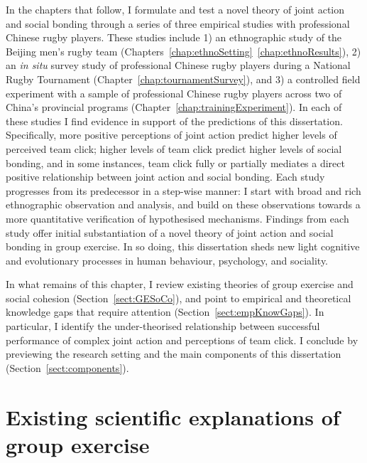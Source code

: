 \begin{CJK}{UTF8}{gbsn}
In the chapters that follow, I formulate and test a novel theory of joint action and social bonding through a series of three empirical studies with professional Chinese rugby players.  These studies include 1) an ethnographic study of the Beijing men's rugby team (Chapters~\ref{chap:ethnoSetting}\nobreakdash~\ref{chap:ethnoResults}), 2) an \textit{in situ} survey study of professional Chinese rugby players during a National Rugby Tournament (Chapter~\ref{chap:tournamentSurvey}), and 3) a controlled field experiment with a sample of professional Chinese rugby players across two of China's provincial programs (Chapter~\ref{chap:trainingExperiment}).  In each of these studies I find evidence in support of the predictions of this dissertation.  Specifically, more positive perceptions of joint action predict higher levels of perceived team click; higher levels of team click predict higher levels of social bonding, and in some instances, team click fully or partially mediates a direct positive relationship between  joint action and social bonding.  Each study progresses from its predecessor in a step-wise manner: I start with broad and rich ethnographic observation and analysis, and build on these observations towards a more quantitative verification of hypothesised mechanisms.  Findings from each study offer initial substantiation of a novel theory of joint action and social bonding in group exercise.  In so doing, this dissertation sheds new light cognitive and evolutionary processes in human behaviour, psychology, and sociality.

In what remains of this chapter, I review existing theories of group exercise and social cohesion (Section~\ref{sect:GESoCo}), and point to empirical and theoretical knowledge gaps that require attention (Section~\ref{sect:empKnowGaps}).  In particular, I identify the under-theorised relationship between successful performance of complex joint action and perceptions of team click.  I conclude by previewing the research setting and the main components of this dissertation (Section~\ref{sect:components}).



\section{Existing scientific explanations of group exercise\label{sect:GESoCo}}


\end{CJK}
